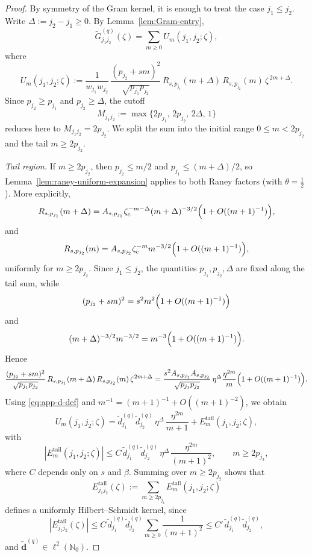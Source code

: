 \documentclass[10pt,a4paper]{amsart}
\newcommand{\NN}{\mathbb{N}}
\begin{document}
\begin{proof}
	By symmetry of the Gram kernel, it is enough to treat the case \(j_1\le j_2\). Write \(\Delta:=j_2-j_1\ge0\).  By
	Lemma~\ref{lem:Gram-entry},
	\[
		\widetilde G^{(q)}_{j_1j_2}(\zeta)=\sum_{m\ge0}U_m(j_1,j_2;\zeta),
	\]
	where
	\[
		U_{m}(j_1,j_2;\zeta)
		:=
		\frac{1}{w_{j_1}w_{j_2}}\,
		\frac{(p_{j_2}+sm)^{2}}{\sqrt{p_{j_1}p_{j_2}}}\,
		R_{s,p_{j_1}}(m+\Delta)\,R_{s,p_{j_2}}(m)\,\zeta^{\,2m+\Delta}.
	\]
	Since \(p_{j_2}\ge p_{j_1}\) and \(p_{j_2}\ge \Delta\), the cutoff
	\[
		M_{j_1j_2}:=\max\{2p_{j_1},\,2p_{j_2},\,2\Delta,\,1\}
	\]
	reduces here to \(M_{j_1j_2}=2p_{j_2}\).  We split the sum into the initial
	range \(0\le m<2p_{j_2}\) and the tail \(m\ge2p_{j_2}\).


	\smallskip
	\noindent\emph{Tail region.}
	If \(m\ge2p_{j_2}\), then \(p_{j_2}\le m/2\) and
	\(p_{j_1}\le (m+\Delta)/2\), so Lemma~\ref{lem:raney-uniform-expansion}
	applies to both Raney factors (with \(\theta=\frac12\)). More explicitly,
	\[
		R_{s,p_{j_1}}(m+\Delta)
		=
		A_{s,p_{j_1}}\zeta_c^{-m-\Delta}(m+\Delta)^{-3/2}
		\Bigl(1+O((m+1)^{-1})\Bigr),
	\]
	and
	\[
		R_{s,p_{j_2}}(m)
		=
		A_{s,p_{j_2}}\zeta_c^{-m}m^{-3/2}
		\Bigl(1+O((m+1)^{-1})\Bigr),
	\]
	uniformly for \(m\ge2p_{j_2}\). Since \(j_1\le j_2\), the quantities
	\(p_{j_1},p_{j_2},\Delta\) are fixed along the tail sum, while
	\[
		(p_{j_2}+sm)^2=s^2m^2\Bigl(1+O((m+1)^{-1})\Bigr)
	\]
	and
	\[
		(m+\Delta)^{-3/2}m^{-3/2}
		=
		m^{-3}\Bigl(1+O((m+1)^{-1})\Bigr).
	\]
	Hence
	\[
		\frac{(p_{j_2}+sm)^2}{\sqrt{p_{j_1}p_{j_2}}}\,
		R_{s,p_{j_1}}(m+\Delta)\,R_{s,p_{j_2}}(m)\,\zeta^{2m+\Delta}
		=
		\frac{s^2A_{s,p_{j_1}}A_{s,p_{j_2}}}{\sqrt{p_{j_1}p_{j_2}}}\,
		\eta^\Delta\frac{\eta^{2m}}{m}
		\Bigl(1+O((m+1)^{-1})\Bigr).
	\]
	Using \eqref{eq:app-d-def} and \(m^{-1}=(m+1)^{-1}+O((m+1)^{-2})\), we
	obtain
	\begin{equation}\label{eq:Sm-decomp}
		U_m(j_1,j_2;\zeta)
		=
		\widetilde d^{(q)}_{j_1}\widetilde d^{(q)}_{j_2}\,\eta^{\Delta}\,
		\frac{\eta^{2m}}{m+1}
		+E_m^{\mathrm{tail}}(j_1,j_2;\zeta),
	\end{equation}
	with
	\begin{equation}\label{eq:Sm-error}
		|E_m^{\mathrm{tail}}(j_1,j_2;\zeta)|
		\le
		C\,\widetilde d^{(q)}_{j_1}\widetilde d^{(q)}_{j_2}\,\eta^{\Delta}\,
		\frac{\eta^{2m}}{(m+1)^2},
		\qquad m\ge 2p_{j_2},
	\end{equation}
	where \(C\) depends only on \(s\) and \(\beta\).  Summing over \(m\ge2p_{j_2}\)
	shows that
	\[
		E^{\mathrm{tail}}_{j_1j_2}(\zeta)
		:=\sum_{m\ge2p_{j_2}}E_m^{\mathrm{tail}}(j_1,j_2;\zeta)
	\]
	defines a uniformly Hilbert--Schmidt kernel, since
	\[
		|E^{\mathrm{tail}}_{j_1j_2}(\zeta)|
		\le
		C\,\widetilde d^{(q)}_{j_1}\widetilde d^{(q)}_{j_2}
		\sum_{m\ge0}\frac{1}{(m+1)^2}
		\le
		C'\,\widetilde d^{(q)}_{j_1}\widetilde d^{(q)}_{j_2},
	\]
	and \(\widetilde{\bm d}^{(q)}\in\ell^2(\NN_0)\).



\end{proof}
\end{document}
